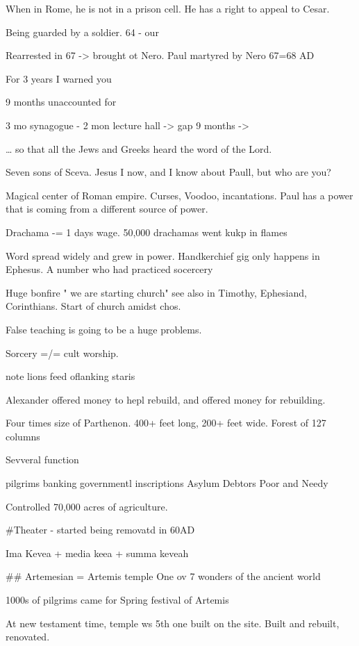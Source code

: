 \documentclass[
]{book}
\begin{document}
When in Rome, he is not in a prison cell. He has a right to appeal to Cesar.

Being guarded by a soldier. 64 - our

Rearrested in 67 -\textgreater{} brought ot Nero. Paul martyred by Nero 67=68 AD

For 3 years I warned you

9 months unaccounted for

3 mo synagogue - 2 mon lecture hall -\textgreater{} gap 9 months -\textgreater{}

\ldots{} so that all the Jews and Greeks heard the word of the Lord.

Seven sons of Sceva. Jesus I now, and I know about Paull, but who are you?

Magical center of Roman empire. Curses, Voodoo, incantations. Paul has a power that is coming from a different source of power.

Drachama -= 1 days wage. 50,000 drachamas went kukp in flames

Word spread widely and grew in power. Handkerchief gig only happens in Ephesus. A number who had practiced socercery

Huge bonfire " we are starting church" see also in Timothy, Ephesiand, Corinthians. Start of church amidst chos.

False teaching is going to be a huge problems.

Sorcery =/= cult worship.

note lions feed oflanking staris

Alexander offered money to hepl rebuild, and offered money for rebuilding.

Four times size of Parthenon. 400+ feet long, 200+ feet wide. Forest of 127 columns

Sevveral function

pilgrims
banking
governmentl inscriptions
Asylum
Debtors
Poor and Needy

Controlled 70,000 acres of agriculture.

\#Theater - started being removatd in 60AD

Ima Kevea + media keea + summa keveah

\#\# Artemesian = Artemis temple One ov 7 wonders of the ancient world

1000s of pilgrims came for Spring festival of Artemis

At new testament time, temple ws 5th one built on the site. Built and rebuilt, renovated.
\end{document}
